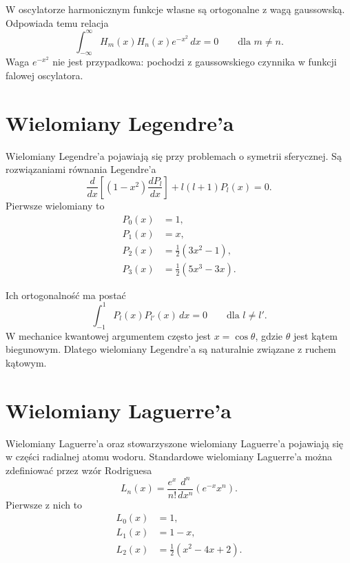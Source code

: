 W oscylatorze harmonicznym funkcje własne są ortogonalne z wagą gaussowską. Odpowiada temu relacja
\begin{equation}
    \int_{-\infty}^{\infty}H_m(x)H_n(x)e^{-x^2}\,dx=0
    \qquad \text{dla } m\neq n.
\end{equation}
Waga \(e^{-x^2}\) nie jest przypadkowa: pochodzi z gaussowskiego czynnika w funkcji falowej oscylatora.

\section{Wielomiany Legendre'a}

Wielomiany Legendre'a pojawiają się przy problemach o symetrii sferycznej. Są rozwiązaniami równania Legendre'a
\begin{equation}
    \frac{d}{dx}\left[(1-x^2)\frac{dP_l}{dx}\right]+l(l+1)P_l(x)=0.
\end{equation}
Pierwsze wielomiany to
\begin{align}
    P_0(x)&=1,\\
    P_1(x)&=x,\\
    P_2(x)&=\frac{1}{2}(3x^2-1),\\
    P_3(x)&=\frac{1}{2}(5x^3-3x).
\end{align}

Ich ortogonalność ma postać
\begin{equation}
    \int_{-1}^{1}P_l(x)P_{l'}(x)\,dx=0
    \qquad \text{dla } l\neq l'.
\end{equation}
W mechanice kwantowej argumentem często jest \(x=\cos\theta\), gdzie \(\theta\) jest kątem biegunowym. Dlatego wielomiany Legendre'a są naturalnie związane z ruchem kątowym.

\section{Wielomiany Laguerre'a}

Wielomiany Laguerre'a oraz stowarzyszone wielomiany Laguerre'a pojawiają się w części radialnej atomu wodoru. Standardowe wielomiany Laguerre'a można zdefiniować przez wzór Rodriguesa
\begin{equation}
    L_n(x)=\frac{e^x}{n!}\frac{d^n}{dx^n}\left(e^{-x}x^n\right).
\end{equation}
Pierwsze z nich to
\begin{align}
    L_0(x)&=1,\\
    L_1(x)&=1-x,\\
    L_2(x)&=\frac{1}{2}(x^2-4x+2).
\end{align}

